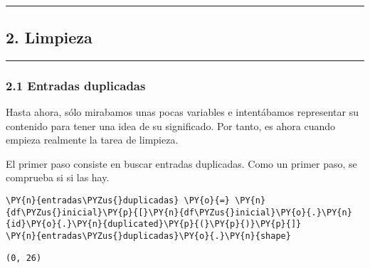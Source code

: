     \begin{center}
    \end{center}
    { \hspace*{\fill} \\}
    
    \begin{center}\rule{0.5\linewidth}{0.5pt}\end{center}

\hypertarget{limpieza}{%
\subsection{2. Limpieza}\label{limpieza}}

\begin{center}\rule{0.5\linewidth}{0.5pt}\end{center}

\hypertarget{entradas-duplicadas}{%
\subsubsection{2.1 Entradas duplicadas}\label{entradas-duplicadas}}

Hasta ahora, sólo mirabamos unas pocas variables e intentábamos
representar su contenido para tener una idea de su significado. Por
tanto, es ahora cuando empieza realmente la tarea de limpieza.

El primer paso consiste en buscar entradas duplicadas. Como un primer
paso, se comprueba si si las hay.

    \begin{tcolorbox}[breakable, size=fbox, boxrule=1pt, pad at break*=1mm,colback=cellbackground, colframe=cellborder]
\begin{Verbatim}[commandchars=\\\{\}]
\PY{n}{entradas\PYZus{}duplicadas} \PY{o}{=} \PY{n}{df\PYZus{}inicial}\PY{p}{[}\PY{n}{df\PYZus{}inicial}\PY{o}{.}\PY{n}{id}\PY{o}{.}\PY{n}{duplicated}\PY{p}{(}\PY{p}{)}\PY{p}{]}
\PY{n}{entradas\PYZus{}duplicadas}\PY{o}{.}\PY{n}{shape}
\end{Verbatim}
\end{tcolorbox}

            \begin{tcolorbox}[breakable, size=fbox, boxrule=.5pt, pad at break*=1mm, opacityfill=0]
\begin{Verbatim}[commandchars=\\\{\}]
(0, 26)
\end{Verbatim}
\end{tcolorbox}
        
